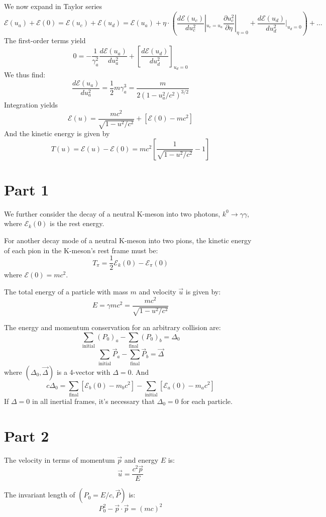 \documentclass{article}
\begin{document}
	We now expand in Taylor series
	\[ \mathcal{E}(u_a) + \mathcal{E}(0) = \mathcal{E}(u_c) + \mathcal{E}(u_d) = \mathcal{E}(u_a) + \eta \cdot (\frac{d\mathcal{E}(u_c)}{du_c^2}|_{u_c=u_a} \frac{\partial u_c^2}{\partial \eta}|_{\eta=0} + \frac{d\mathcal{E}(u_d)}{du_d^2}|_{u_d=0}) + \dots \]
	The first-order terms yield
	\[ 0 = -\frac{1}{\gamma_a^2}\frac{d\mathcal{E}(u_a)}{du_a^2} + [\frac{d\mathcal{E}(u_d)}{du_d^2}]_{u_d=0} \]
	We thus find:
	\[ \frac{d\mathcal{E}(u_a)}{du_a^2} = \frac{1}{2}m\gamma_a^3 = \frac{m}{2(1-u_a^2/c^2)^{3/2}} \]
	Integration yields
	\[ \mathcal{E}(u) = \frac{mc^2}{\sqrt{1-u^2/c^2}} + [\mathcal{E}(0) - mc^2] \]
	And the kinetic energy is given by
	\[ T(u) = \mathcal{E}(u) - \mathcal{E}(0) = mc^2\left[\frac{1}{\sqrt{1-u^2/c^2}} - 1\right] \]
	\section*{Part 1}
	
	We further consider the decay of a neutral K-meson into two photons, $k^0 \to \gamma\gamma$, where $\mathcal{E}_k(0)$ is the rest energy.
	
	For another decay mode of a neutral K-meson into two pions, the kinetic energy of each pion in the K-meson's rest frame must be:
	$$ T_{\pi} = \frac{1}{2}\mathcal{E}_k(0) - \mathcal{E}_{\pi}(0) $$
	where $\mathcal{E}(0) = mc^2$.
	
	The total energy of a particle with mass $m$ and velocity $\vec{u}$ is given by:
	$$ E = \gamma m c^2 = \frac{mc^2}{\sqrt{1 - u^2/c^2}} $$
	
	The energy and momentum conservation for an arbitrary collision are:
	$$ \sum_{\text{initial}} (P_0)_a - \sum_{\text{final}} (P_0)_b = \Delta_0 $$
	$$ \sum_{\text{initial}} \vec{P}_a - \sum_{\text{final}} \vec{P}_b = \vec{\Delta} $$
	where $(\Delta_0, \vec{\Delta})$ is a 4-vector with $\Delta = 0$.
	And
	$$ c\Delta_0 = \sum_{\text{final}} [\mathcal{E}_b(0) - m_b c^2] - \sum_{\text{initial}} [\mathcal{E}_a(0) - m_a c^2] $$
	If $\Delta=0$ in all inertial frames, it's necessary that $\Delta_0 = 0$ for each particle.
	
	\section*{Part 2}
	
	The velocity in terms of momentum $\vec{p}$ and energy $E$ is:
	$$ \vec{u} = \frac{c^2 \vec{p}}{E} $$
	
	The invariant length of $(P_0 = E/c, \vec{P})$ is:
	$$ P_0^2 - \vec{p} \cdot \vec{p} = (mc)^2 $$
	
\end{document}

